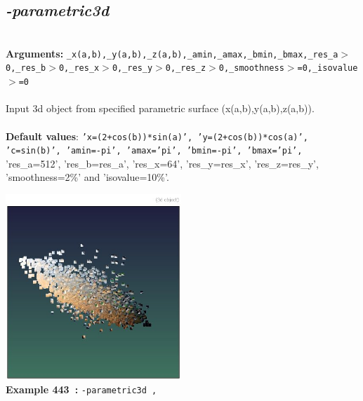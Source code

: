 \documentclass[a4paper,11pt,twoside]{book}
\begin{document}
\subsection{\emph{-parametric3d} }\vspace*{-0.5em}
~\\\textbf{Arguments: } 
{\small \texttt{\_x(a,b),\_y(a,b),\_z(a,b),\_amin,\_amax,\_bmin,\_bmax,\_res\_a$>$0,\_res\_b$>$0,\_res\_x$>$0,\_res\_y$>$0,\_res\_z$>$0,\_smoothness$>$=0,\_isovalue$>$=0}}\\~\\
Input 3d object from specified parametric surface (x(a,b),y(a,b),z(a,b)).
~\\~\\\textbf{Default values}: {\small \texttt{'x=(2+cos(b))*sin(a)', 'y=(2+cos(b))*cos(a)', 'c=sin(b)', 'amin=-pi', 'amax='pi', 'bmin=-pi', 'bmax='pi',}}
~\\'res\_a=512', 'res\_b=res\_a', 'res\_x=64', 'res\_y=res\_x', 'res\_z=res\_y', 'smoothness=2\%' and 'isovalue=10\%'.
\begin{center}\includegraphics[keepaspectratio=true,height=7cm,width=\textwidth]{img/gmic_def443.jpg}\\
{\footnotesize \textbf{Example 443~:} \texttt{-parametric3d ,}}
\end{center}
\end{document}
